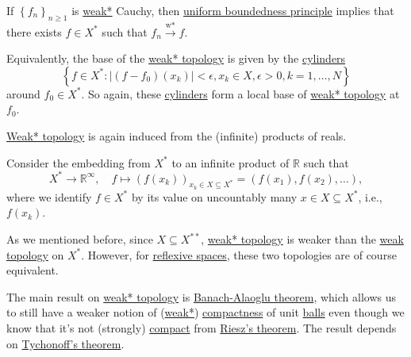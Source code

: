 \begin{note}[Completeness]
	If \(\left\{ f_n \right\}_{n \geq 1}\) is \hyperref[def:weak*-convergence]{weak*} Cauchy, then \hyperref[thm:uniform-boundedness]{uniform boundedness principle} implies that there exists \(f\in X^{\ast} \) such that \(f_n \overset{\text{w*}}{\to } f\).
\end{note}

Equivalently, the base of the \hyperref[def:weak*-topology]{weak* topology} is given by the \href{https://en.wikipedia.org/wiki/Cylinder_set}{cylinders}
\[
	\left\{ f\in X^{\ast} \colon \left\vert (f-f_0)(x_k) \right\vert < \epsilon , x_k\in X, \epsilon > 0, k = 1, \dots , N \right\}
\]
around \(f_0\in X^{\ast}\). So again, these \href{https://en.wikipedia.org/wiki/Cylinder_set}{cylinders} form a local base of \hyperref[def:weak*-topology]{weak* topology} at \(f_0\).

\begin{remark}
	\hyperref[def:weak*-topology]{Weak* topology} is again induced from the (infinite) products of reals.
\end{remark}
\begin{explanation}
	Consider the embedding from \(X^{\ast} \) to an infinite product of \(\mathbb{R} \) such that
	\[
		X^{\ast}\to \mathbb{R} ^{\infty} ,
		\quad f\mapsto (f(x_k))_{x_k\in X\subseteq X^{\ast}} = (f(x_1), f(x_2), \dots ),
	\]
	where we identify \(f\in X^{\ast}\) by its value on uncountably many \(x \in X \subseteq X^{\ast} \), i.e., \(f(x_k)\).
\end{explanation}

As we mentioned before, since \(X \subseteq X^{\ast\ast}\), \hyperref[def:weak*-topology]{weak* topology} is weaker than the \hyperref[def:weak-topology]{weak topology} on \(X^{\ast} \). However, for \hyperref[def:reflexive-space]{reflexive spaces}, these two topologies are of course equivalent.

The main result on \hyperref[def:weak*-topology]{weak* topology} is \hyperref[thm:Banach-Alaoglu]{Banach-Alaoglu theorem}, which allows us to still have a weaker notion of (\hyperref[def:weak*-topology]{weak*}) \hyperref[def:compact]{compactness} of unit \hyperref[def:ball]{balls} even though we know that it's not (strongly) \hyperref[def:compact]{compact} from \hyperref[thm:Riesz]{Riesz's theorem}. The result depends on \hyperref[thm:Tychonoff]{Tychonoff's theorem}.

